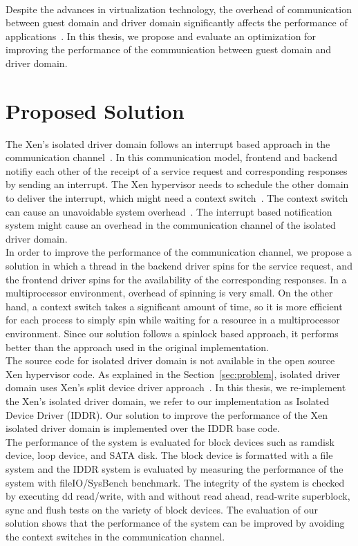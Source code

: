 \\[3mm]
Despite the advances in virtualization technology, the overhead of communication between guest domain and driver domain significantly affects the performance of applications~\cite{Barham:2003:XAV:945445.945462, Sugerman:2001:VID:647055.715774, Menon:2006:ONV:1267359.1267361}. In this thesis, we propose and evaluate an optimization for improving the performance of the communication between guest domain and driver domain. 

\section {Proposed Solution}

The Xen's isolated driver domain follows an interrupt based approach in the communication channel~\cite{Barham:2003:XAV:945445.945462}. In this communication model, frontend and backend notifiy each other of the receipt of a service request and corresponding responses by sending an interrupt. The Xen hypervisor needs to schedule the other domain to deliver the interrupt, which might need a context switch~\cite{Barham:2003:XAV:945445.945462}. The context switch can cause an unavoidable system overhead~\cite{Li:2007:QCC:1281700.1281702, Mogul:1991:ECS:106973.106982}. The interrupt based notification system might cause an overhead in the communication channel of the isolated driver domain. 
\\[3mm]
In order to improve the performance of the communication channel, we propose a solution in which a thread in the backend driver spins for the service request, and the frontend driver spins for the availability of the corresponding responses. In a multiprocessor environment, overhead of spinning is very small. On the other hand, a context switch takes a significant amount of time, so it is more efficient for each process to simply spin while waiting for a resource in a multiprocessor environment. Since our solution follows a spinlock based approach, it performs better than the approach used in the original implementation.
\\[3mm]
The source code for isolated driver domain is not available in the open source Xen hypervisor code. As explained in the Section~\ref{sec:problem}, isolated driver domain uses Xen's split device driver approach~\cite{Fraser04safehardware}. In this thesis, we re-implement the Xen's isolated driver domain, we refer to our implementation as Isolated Device Driver (IDDR). Our solution to improve the performance of the Xen isolated driver domain is implemented over the IDDR base code.
\\[3mm]
The performance of the system is evaluated for block devices such as ramdisk device, loop device, and SATA disk. The block device is formatted with a file system and the IDDR system is evaluated by measuring the performance of the system with fileIO/SysBench benchmark. The integrity of the system is checked by executing dd read/write, with and without read ahead, read-write superblock, sync and flush tests on the variety of block devices. The evaluation of our solution shows that the performance of the system can be improved by avoiding the context switches in the communication channel. 
\pagebreak
